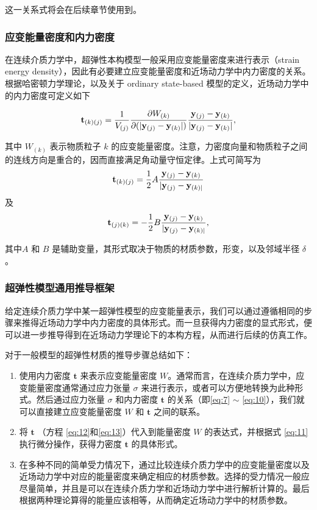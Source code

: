 这一关系式将会在后续章节使用到。

\subsubsection{应变能量密度和内力密度}
在连续介质力学中，超弹性本构模型一般采用应变能量密度来进行表示（strain energy density），因此有必要建立应变能量密度和近场动力学中内力密度的关系。根据哈密顿力学理论，以及关于 ordinary state-based 模型的定义，近场动力学中的内力密度可定义如下

\begin{equation}
\mathbf{t}_{(k)(j)}=\frac{1}{V_{(j)}}\frac{\partial W_{(k)}}{\partial (|\mathbf{y}_{(j)}-\mathbf{y}_{(k)}|)}\frac{\mathbf{y}_{(j)}-\mathbf{y}_{(k)}}{|\mathbf{y}_{(j)}-\mathbf{y}_{(k)}|},
\label{eq:11}
\end{equation}

其中 $W_{(k)}$ 表示物质粒子 $k$ 的应变能量密度。注意，力密度向量和物质粒子之间的连线方向是重合的，因而直接满足角动量守恒定律。上式可简写为
\begin{equation}
\mathbf{t}_{(k)(j)} = \frac{1}{2}A\frac{\mathbf{y}_{(j)}-\mathbf{y}_{(k)}}{|\mathbf{y}_{(j)}-\mathbf{y}_{(k)|}}
\label{eq:12}
\end{equation}
及
\begin{equation}
\mathbf{t}_{(j)(k)} = -\frac{1}{2}B\frac{\mathbf{y}_{(j)}-\mathbf{y}_{(k)}}{|\mathbf{y}_{(j)}-\mathbf{y}_{(k)|}},
\label{eq:13}
\end{equation}

其中$A$ 和 $B$ 是辅助变量，其形式取决于物质的材质参数，形变，以及邻域半径 $\delta$。

\subsubsection{超弹性模型通用推导框架}
给定连续介质力学中某一超弹性模型的应变能量表示，我们可以通过遵循相同的步骤来推得近场动力学中内力密度的具体形式。而一旦获得内力密度的显式形式，便可以进一步推导得到在近场动力学理论下的本构方程，从而进行后续的仿真工作。

对于一般模型的超弹性材质的推导步骤总结如下：
\begin{enumerate}
  \item 使用内力密度 $\mathbf{t}$ 来表示应变能量密度 $W$。通常而言，在连续介质力学中，应变能量密度通常通过应力张量 $\sigma$ 来进行表示，或者可以方便地转换为此种形式。然后通过应力张量 $\sigma$ 和内力密度 $\mathbf{t}$ 的关系（即\ref{eq:7} $\sim$ \ref{eq:10}），我们就可以直接建立应变能量密度 $W$ 和 $\mathbf{t}$ 之间的联系。
  \item 将 $\mathbf{t}$ （方程 \ref{eq:12}和\ref{eq:13}）代入到能量密度 $W$ 的表达式，并根据式 \ref{eq:11} 执行微分操作，获得力密度 $\mathbf{t}$ 的具体形式。
  \item 在多种不同的简单受力情况下，通过比较连续介质力学中的应变能量密度以及近场动力学中对应的能量密度来确定相应的材质参数。选择的受力情况一般应尽量简单，并且是可以在连续介质力学和近场动力学中进行解析计算的。最后根据两种理论算得的能量应该相等，从而确定近场动力学中的材质参数。
\end{enumerate}

